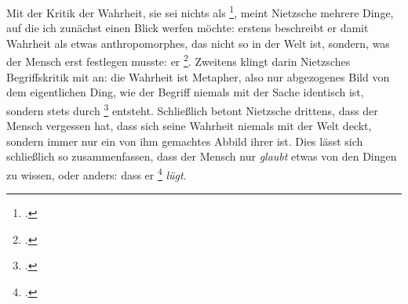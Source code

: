 \documentclass[12pt, a4paper, openany]{report}
\begin{document}
Mit der Kritik der Wahrheit, sie sei nichts als \footcite[][880]{nietzsche_geburt_1999}, meint Nietzsche mehrere Dinge, auf die ich zunächst einen Blick werfen möchte: 
erstens beschreibt er damit Wahrheit als etwas anthropomorphes, das nicht so in der Welt ist, sondern, was der Mensch erst festlegen musste: er \footcite[][877]{nietzsche_geburt_1999}.
Zweitens klingt darin Nietzsches Begriffskritik mit an:
die Wahrheit ist Metapher, also nur abgezogenes Bild von dem eigentlichen Ding, wie der Begriff niemals mit der Sache identisch ist, sondern stets durch \footcite[][880]{nietzsche_geburt_1999} entsteht.
Schließlich betont Nietzsche drittens, dass der Mensch vergessen hat, dass sich seine Wahrheit niemals mit der Welt deckt, sondern immer nur ein von ihm gemachtes Abbild ihrer ist. 
Dies lässt sich schließlich so zusammenfassen, dass der Mensch nur \emph{glaubt} etwas von den Dingen zu wissen, oder anders: dass er \footcite[][881]{nietzsche_geburt_1999} \emph{lügt}.\\
\end{document}
